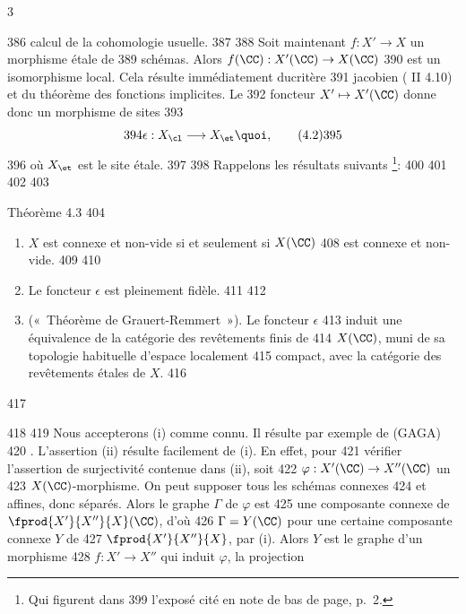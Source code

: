 3	\documentclass[10pt]{../fichiers-configuration-latex/smfart}
\begin{document}
   386	calcul de la cohomologie usuelle.
   387	
   388	Soit maintenant $f:X'\rightarrow X$ un morphisme étale de
   389	schémas. Alors $f(\CC):X'(\CC)\rightarrow X(\CC)$
   390	est un isomorphisme local. Cela résulte immédiatement du\pageoriginale critère
   391	jacobien ( II 4.10) et du théorème des fonctions implicites. Le
   392	foncteur $X'\mapsto X'(\CC)$ donne donc un morphisme de sites
   393	\begin{equation*}
   394	\epsilon:X_{\cl}\longrightarrow X_{\et}{\quoi},\tag{4.2}
   395	\end{equation*}
   396	où $X_{\et}$ est le site étale.
   397	
   398	Rappelons les résultats suivants \footnote{Qui figurent dans
   399	  l'exposé cité en note de bas de page, p.~2.}: %
   400	                                %
   401	                                %
   402	
   403	\begin{enonce*}{Théorème 4.3}
   404	\begin{enumerate}
   405	\renewcommand{\theenumi}{\roman{enumi}}
   406	\renewcommand{\labelenumi}{(\theenumi)}
   407	\item $X$ est connexe et non-vide si et seulement si $X(\CC)$
   408	  est connexe et non-vide.
   409	
   410	\item Le foncteur $\epsilon$ est pleinement fidèle.
   411	
   412	\item (« Théorème de Grauert-Remmert »). Le foncteur $\epsilon$
   413	  induit une équivalence de la catégorie des revêtements finis de
   414	  $X(\CC)$, muni de sa topologie habituelle d'espace localement
   415	  compact, avec la catégorie des revêtements étales de $X$.
   416	\end{enumerate}
   417	\end{enonce*}
   418	
   419	Nous accepterons (i) comme connu. Il résulte par exemple de (GAGA) %
   420	\cite{4}. L'assertion (ii) résulte facilement de (i). En effet, pour
   421	vérifier l'assertion de surjectivité contenue dans (ii), soit
   422	$\varphi:X'(\CC)\rightarrow X''(\CC)$ un
   423	$X(\CC)$-morphisme. On peut supposer tous les schémas connexes
   424	et affines, donc séparés. Alors le graphe $\Gamma$ de $\varphi$ est
   425	une composante connexe de $\fprod{X'}{X''}{X}(\CC)$, d'où
   426	$\Gamma=Y(\CC)$ pour une certaine composante connexe $Y$ de
   427	$\fprod{X'}{X''}{X}$, par (i). Alors $Y$ est le graphe d'un morphisme
   428	$f:X'\rightarrow X''$ qui induit $\varphi$, \ie la projection
\end{document}
